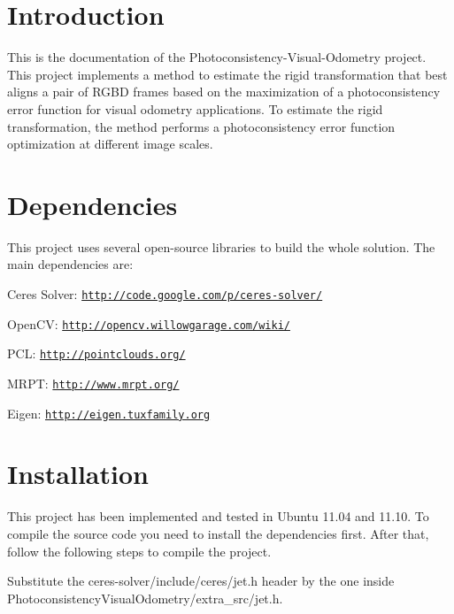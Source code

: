 \hypertarget{index_intro_sec}{}\section{Introduction}\label{index_intro_sec}
This is the documentation of the Photoconsistency-\/Visual-\/Odometry project. This project implements a method to estimate the rigid transformation that best aligns a pair of RGBD frames based on the maximization of a photoconsistency error function for visual odometry applications. To estimate the rigid transformation, the method performs a photoconsistency error function optimization at different image scales.

 \hypertarget{index_dependencies_sec}{}\section{Dependencies}\label{index_dependencies_sec}
This project uses several open-\/source libraries to build the whole solution. The main dependencies are:
\begin{DoxyItemize}
\item Ceres Solver: \href{http://code.google.com/p/ceres-solver/}{\tt http://code.google.com/p/ceres-\/solver/}
\item OpenCV: \href{http://opencv.willowgarage.com/wiki/}{\tt http://opencv.willowgarage.com/wiki/}
\item PCL: \href{http://pointclouds.org/}{\tt http://pointclouds.org/}
\item MRPT: \href{http://www.mrpt.org/}{\tt http://www.mrpt.org/}
\item Eigen: \href{http://eigen.tuxfamily.org}{\tt http://eigen.tuxfamily.org}
\end{DoxyItemize}\hypertarget{index_install_sec}{}\section{Installation}\label{index_install_sec}
This project has been implemented and tested in Ubuntu 11.04 and 11.10. To compile the source code you need to install the dependencies first. After that, follow the following steps to compile the project.
\begin{DoxyItemize}
\item Substitute the ceres-\/solver/include/ceres/jet.h header by the one inside PhotoconsistencyVisualOdometry/extra\_\-src/jet.h.
\end{DoxyItemize}



